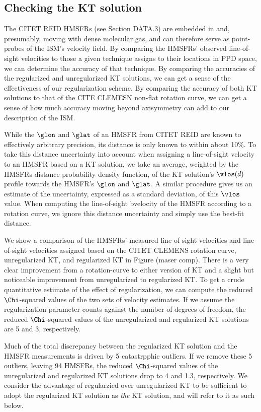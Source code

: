 \subsection{Checking the KT solution}
\label{sec:KT-validation}

The CITET REID HMSFRs (see Section DATA.3) are embedded in and, presumably, moving with dense molecular gas, and can therefore serve as point-probes of the ISM's velocity field. 
By comparing the HMSFRs' observed line-of-sight velocities to those a given technique assigns to their locations in PPD space, we can determine the accuracy of that technique. 
By comparing the accuracies of the regularized and unregularized KT solutions, we can get a sense of the effectiveness of our regularization scheme. 
By comparing the accuracy of both KT solutions to that of the CITE CLEMESN non-flat rotation curve, we can get a sense of how much accuracy moving beyond axisymmetry can add to our description of the ISM. 

While the $\glon$ and $\glat$ of an HMSFR from CITET REID are known to effectively arbitrary precision, its distance is only known to within about 10\%. 
To take this distance uncertainty into account when assigning a line-of-sight velocity to an HMSFR based on a KT solution, we take an average, weighted by the HMSFRs distance probability density function, of the KT solution's $\vlos(d)$ profile towards the HMSFR's $\glon$ and $\glat$. 
A similar procedure gives us an estimate of the uncertainty, expressed as a standard deviation, of this $\vlos$ value. 
When computing the line-of-sight bvelocity of the HMSFR according to a rotation curve, we ignore this distance uncertainty and simply use the best-fit distance. 

We show a comparison of the HMSFRs' measured line-of-sight velocities and line-of-sight velocities assigned based on the CITET CLEMENS rotation curve, unregularized KT, and regularized KT in Figure (maser comp). 
There is a very clear improvement from a rotation-curve to either version of KT and a slight but noticeable improvement from unregularized to regularized KT. 
To get a crude quantitative estimate of the effect of regularization, we can compute the reduced $\Chi$-squared values of the two sets of velocity estimates. 
If we assume the regularization parameter counts against the number of degrees of freedom, the reduced $\Chi$-squared values of the unregularized and regularized KT solutions are 5 and 3, respectively. 

Much of the total discrepancy between the regularized KT solution and the HMSFR measurements is driven by 5 catastrpphic outliers. 
If we remove these 5 outliers, leaving 94 HMSFRs, the reduced $\Chi$-squared values of the unregularized and regularized KT solutions drop to 4 and 1.3, respectively. 
We consider the advantage of regularzied over unregularized KT to be sufficient to adopt the regularized KT solution as \emph{the} KT solution, and will refer to it as such below.

